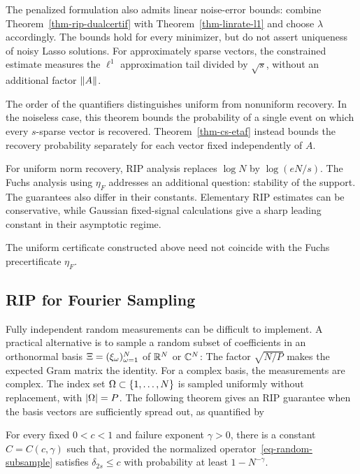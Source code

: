 The penalized formulation also admits linear noise-error bounds: combine Theorem~\ref{thm-rip-dualcertif} with Theorem~\ref{thm-linrate-l1} and choose $\lambda$ accordingly. The bounds hold for every minimizer, but do not assert uniqueness of noisy Lasso solutions. For approximately sparse vectors, the constrained estimate measures the $\ell^1$ approximation tail divided by $\sqrt s$, without an additional factor $\lVert A\rVert$.

The order of the quantifiers distinguishes uniform from nonuniform recovery. In the noiseless case, this theorem bounds the probability of a single event on which every $s$-sparse vector is recovered. Theorem~\ref{thm-cs-etaf} instead bounds the recovery probability separately for each vector fixed independently of $A$.

For uniform norm recovery, RIP analysis replaces $\log N$ by $\log(eN/s)$. The Fuchs analysis using $\eta_F$ addresses an additional question: stability of the support. The guarantees also differ in their constants. Elementary RIP estimates can be conservative, while Gaussian fixed-signal calculations give a sharp leading constant in their asymptotic regime.

The uniform certificate constructed above need not coincide with the Fuchs precertificate $\eta_F$.






\subsection{RIP for Fourier Sampling}

Fully independent random measurements can be difficult to implement. A practical alternative is to sample a random subset of coefficients in an orthonormal basis $\Xi = (\xi_\omega)_{\omega=1}^N$ of $\mathbb{R}^N$ or $\mathbb{C}^N$:
The factor $\sqrt{N/P}$ makes the expected Gram matrix the identity. For a complex basis, the measurements are complex. The index set $\Omega\subset\{1,\ldots,N\}$ is sampled uniformly without replacement, with $|\Omega|=P$.
%
The following theorem gives an RIP guarantee when the basis vectors are sufficiently spread out, as quantified by

\begin{thm}\label{thm-cs-subsample}
	For every fixed $0<c<1$ and failure exponent $\gamma>0$, there is a constant $C=C(c,\gamma)$ such that, provided
	the normalized operator~\eqref{eq-random-subsample} satisfies $\delta_{2s}\leq c$ with probability at least $1-N^{-\gamma}$.
\end{thm}

